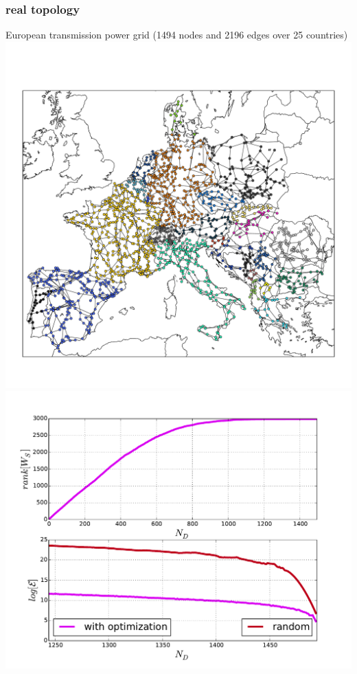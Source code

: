 \documentclass[xcolor=dvipsnames]{beamer}
\begin{document}
\begin{frame}
	\frametitle{real topology}
	
	European transmission power grid (1494 nodes and 2196 edges over 25 countries)
	\includegraphics[scale=.165]{power_grid}
	\includegraphics[scale=.26]{figs2}
\end{frame}
\end{document}
